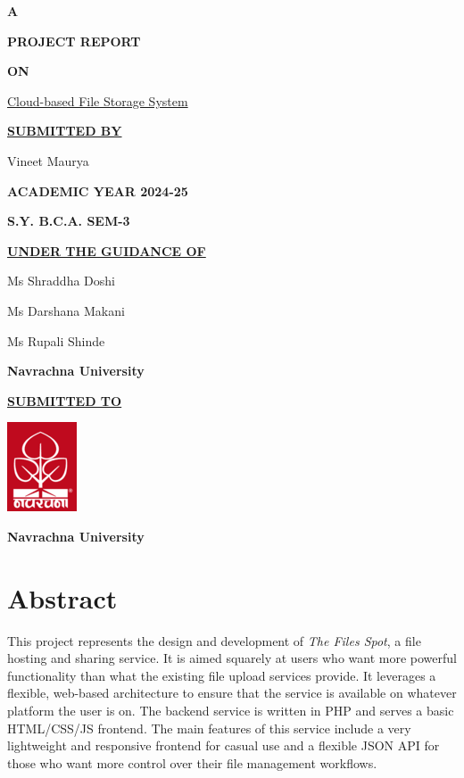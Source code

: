 \documentclass[12pt,a4paper]{report}
\begin{document}
\begin{center}
	\textbf{\LARGE{A}}

	\textbf{\LARGE{PROJECT REPORT}}

	\textbf{\LARGE{ON}}

	\Large{\underline{Cloud-based File Storage System}}
	\vspace{1cm}

	\textbf{\underline{SUBMITTED BY}}

	Vineet Maurya
	\vspace{1cm}

	\textbf{ACADEMIC YEAR 2024-25}

	\textbf{S.Y. B.C.A. SEM-3}
	\vspace{1cm}

	\textbf{\underline{UNDER THE GUIDANCE OF}}

	Ms Shraddha Doshi

	Ms Darshana Makani

	Ms Rupali Shinde

	\textbf{Navrachna University}
	\vspace{1cm}

	\textbf{\underline{SUBMITTED TO}}
	\vspace{0.5cm}

	\includegraphics{nuv_logo.png}
	\vspace{0.5cm}

	\textbf{Navrachna University}
\end{center}
\newpage
{}
\setcounter{page}{1}
\chapter*{Abstract}
This project represents the design and development of \textit{The Files Spot}, a file hosting and sharing service. It is aimed squarely at users who want more powerful functionality than what the existing file upload services provide. It leverages a flexible, web-based architecture to ensure that the service is available on whatever platform the user is on. The backend service is written in PHP and serves a basic HTML/CSS/JS frontend. The main features of this service include a very lightweight and responsive frontend for casual use and a flexible JSON API for those who want more control over their file management workflows.
\newpage
\end{document}
